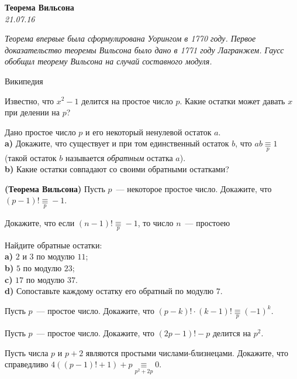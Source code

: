 \begin{center}
\textbf{\Large Теорема Вильсона}\\
\textit{21.07.16}
\end{center}

\epigraph{\it Теорема впервые была сформулирована Уорингом в 1770 году. Первое доказательство теоремы Вильсона было дано в 1771 году Лагранжем. Гаусс обобщил теорему Вильсона на случай составного модуля.}{Википедия}

\begin{problems}
\item Известно, что $x^2-1$ делится на простое число $p$. Какие остатки может давать $x$ при делении на $p$?

\item Дано простое число $p$  и его некоторый ненулевой остаток $a$.\\
\textbf{a)} Докажите, что существует и при том единственный остаток $b$, что $ab \mathop{\equiv}\limits_p 1$ (такой остаток $b$ называется \textit{обратным} остатка $a$).\\
\textbf{b)} Какие остатки совпадают со своими обратными остатками?

\item \textbf{(Теорема Вильсона)} Пусть $p$~--- некоторое простое число. Докажите, что $(p-1)! \mathop{\equiv}\limits_p -1$.
\item Докажите, что если $(n-1)! \mathop{\equiv}\limits_p -1$, то число $n$~--- простоею
 
\item Найдите обратные остатки:\\ 
\textbf{a)} $2$ и $3$ по модулю $11$; \\
\textbf{b)} $5$ по модулю $23$;\\
\textbf{c)} $17$ по модулю $37$.\\
\textbf{d)} Сопоставьте каждому остатку его обратный по модулю $7$. 

\item Пусть $p$~--- простое число. Докажите, что  $(p-k)! \cdot (k-1)! \mathop{\equiv}\limits_p (-1)^k$.

\item Пусть $p$~--- простое число. Докажите, что $(2p-1)!-p$ делится на $p^2$. 

\item Пусть числа $p$ и $p+2$ являются простыми числами-близнецами. Докажите, что справедливо   $4((p-1)!+1)+p\mathop{\equiv}\limits_{p^2+2p} 0$.


\end{problems}
